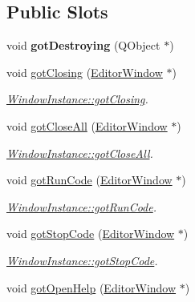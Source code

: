 \subsection*{Public Slots}
\begin{DoxyCompactItemize}
\item 
\hypertarget{classInstances_1_1WindowInstance_a2d5c2c21c6b924bd2e88fafb474c7bd2}{void {\bfseries got\+Destroying} (Q\+Object $\ast$)}\label{classInstances_1_1WindowInstance_a2d5c2c21c6b924bd2e88fafb474c7bd2}

\item 
void \hyperlink{classInstances_1_1WindowInstance_ad6347ebd0f1af6c4b1ae1d843e97ce34}{got\+Closing} (\hyperlink{classEditorWindow}{Editor\+Window} $\ast$)
\begin{DoxyCompactList}\small\item\em \hyperlink{classInstances_1_1WindowInstance_ad6347ebd0f1af6c4b1ae1d843e97ce34}{Window\+Instance\+::got\+Closing}. \end{DoxyCompactList}\item 
void \hyperlink{classInstances_1_1WindowInstance_aed97db1c0bc35d41194c43eca97fa775}{got\+Close\+All} (\hyperlink{classEditorWindow}{Editor\+Window} $\ast$)
\begin{DoxyCompactList}\small\item\em \hyperlink{classInstances_1_1WindowInstance_aed97db1c0bc35d41194c43eca97fa775}{Window\+Instance\+::got\+Close\+All}. \end{DoxyCompactList}\item 
void \hyperlink{classInstances_1_1WindowInstance_ab9b5e2602b584217c2115fca0df87cb3}{got\+Run\+Code} (\hyperlink{classEditorWindow}{Editor\+Window} $\ast$)
\begin{DoxyCompactList}\small\item\em \hyperlink{classInstances_1_1WindowInstance_ab9b5e2602b584217c2115fca0df87cb3}{Window\+Instance\+::got\+Run\+Code}. \end{DoxyCompactList}\item 
void \hyperlink{classInstances_1_1WindowInstance_ab794a3a603f6b6ca75168383b9575524}{got\+Stop\+Code} (\hyperlink{classEditorWindow}{Editor\+Window} $\ast$)
\begin{DoxyCompactList}\small\item\em \hyperlink{classInstances_1_1WindowInstance_ab794a3a603f6b6ca75168383b9575524}{Window\+Instance\+::got\+Stop\+Code}. \end{DoxyCompactList}\item 
void \hyperlink{classInstances_1_1WindowInstance_ad1c5e3fc3c6f0675550786fb14f645a5}{got\+Open\+Help} (\hyperlink{classEditorWindow}{Editor\+Window} $\ast$)

\end{DoxyCompactItemize}
